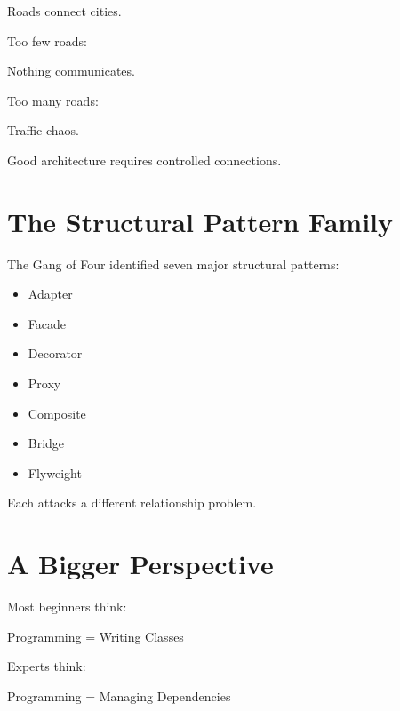\documentclass[11pt,a4paper]{book}
\begin{document}
\begin{mentalmodel}

Roads connect cities.

Too few roads:

Nothing communicates.

Too many roads:

Traffic chaos.

Good architecture requires controlled connections.

\end{mentalmodel}

\section{The Structural Pattern Family}

The Gang of Four identified seven major structural patterns:

\begin{itemize}

\item Adapter
\item Facade
\item Decorator
\item Proxy
\item Composite
\item Bridge
\item Flyweight

\end{itemize}

Each attacks a different relationship problem.

\section{A Bigger Perspective}

\begin{idea}

Most beginners think:

\begin{center}
Programming = Writing Classes
\end{center}

Experts think:

\begin{center}
Programming = Managing Dependencies
\end{center}

\end{idea}
\end{document}
